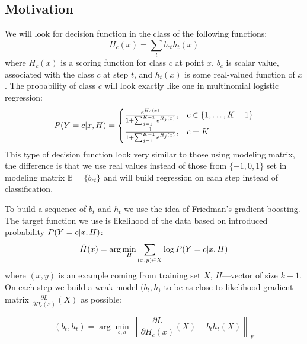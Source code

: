 \documentclass{article}
\begin{document}
\subsection{Motivation}
We will look for decision function in the class of the following functions:
$$
H_c(x) = \sum_t b_{ct} h_t(x) 
$$
where $H_c(x)$ is a scoring function for class $c$ at point $x$, $b_c$ is scalar value, associated with the class $c$ at step $t$, and $h_t(x)$ is some real-valued function of $x$. The probability of class $c$ will look exactly like one in multinomial logistic regression:
\begin{equation}
  P(Y = c \arrowvert x, H) =
  \begin{cases}
    \frac{ e^{H_{c}(x)} }
       { 1+\sum_{j=1}^{K-1} e^{H_{j}(x)} }
    , & c \in \{1, \ldots, K-1 \} \\

    \frac{ 1 }
       { 1 + \sum_{j=1}^{K-1} e^{H_{j}(x)} }
    , & c=K
  \end{cases}
\end{equation}
This type of decision function look very similar to those using modeling matrix, the difference is that we use real values instead of those from $\{-1,0,1\}$ set in modeling matrix $\mathbb{B} = \{b_{ct}\}$ and will build regression on each step instead of classification.

To build a sequence of $b_t$ and $h_t$ we use the idea of Friedman's gradient boosting. The target function we use is likelihood of the data based on introduced probability $P(Y = c \arrowvert x, H)$:
$$
\hat{H}(x) = \arg \min_H \sum_{(x,y) \in X} \log P(Y = c \arrowvert x, H)
$$
where $(x,y)$ is an example coming from training set $X$, $H$---vector of size $k-1$. On each step we build a weak model $(b_t, h_)$ to be as close to likelihood gradient matrix $\frac{\partial L}{\partial H_c(x)}\left(X\right)$ as possible:

$$
(b_t, h_t) = \arg \min_{b,h} \left\|\frac{\partial L}{\partial H_c(x)}\left(X\right) - b_t h_t(X)\right\|_F
$$


\end{document}
